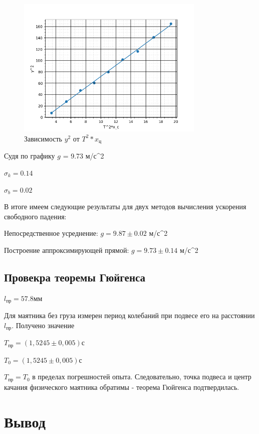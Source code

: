 \documentclass[a4paper, 12pt]{article}
\begin{document}
\clearpage

\begin{figure}[h]
    \centering
    \includegraphics[width=0.8\textwidth]{2.png}
    \caption*{Зависимость $y^2$ от $T^2*x_\text{ц}$}
\end{figure}

Судя по графику $g$ = 9.73 м/с^2

$\sigma_k=0.14$

$\sigma_b = 0.02$

В итоге имеем следующие результаты для двух методов вычисления ускорения свободного
падения:

Непосредственное усреднение: $g=9.87\pm0.02$ м/с^2

Построение аппроксимирующей прямой: $g=9.73\pm0.14$ м/с^2

\subsection*{Провекра теоремы Гюйгенса}

$l_\text{пр}=57.8$мм

Для маятника без груза измерен период колебаний при подвесе его на расстоянии $l_\text{пр}$. Получено значение

$T_\text{пр}=(1,5245 \pm 0,005)$с

$T_0= (1,5245 \pm 0,005)$с

$T_\text{пр}=T_0$ в пределах погрешностей опыта. Следовательно, точка подвеса и центр качания физического маятника обратимы - теорема Гюйгенса подтвердилась.

\newpage

\section*{Вывод}
\end{document}
